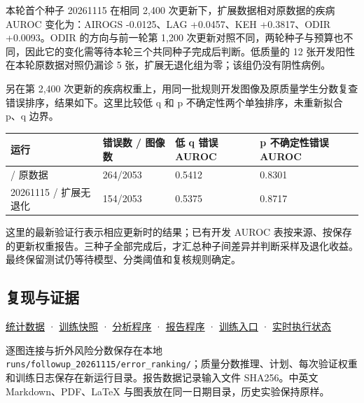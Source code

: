 \documentclass[
  10pt,
]{article}
\begin{document}
本轮首个种子 20261115 在相同 2,400 次更新下，扩展数据相对原数据的疾病
AUROC 变化为：AIROGS -0.0125、LAG +0.0457、KEH +0.3817、ODIR
+0.0093。ODIR 的方向与前一轮第 1,200
次更新对照不同，两轮种子与预算也不同，因此它的变化需等待本轮三个共同种子完成后判断。低质量的
12 张开发阳性在本轮原数据对照仍漏诊 5
张，扩展无退化组为零；该组仍没有阴性病例。

另在第 2,400
次更新的疾病权重上，用同一批规则开发图像及原质量学生分数复查错误排序，结果如下。这里比较低
q 和 p 不确定性两个单独排序，未重新拟合 p、q 边界。

\begin{longtable}[]{@{}llll@{}}
\toprule\noalign{}
运行 & 错误数 / 图像数 & 低 q 错误 AUROC & p 不确定性错误 AUROC \\
\midrule\noalign{}
\endhead
\bottomrule\noalign{}
\endlastfoot
20261115 / 原数据 & 264/2053 & 0.5412 & 0.8301 \\
20261115 / 扩展无退化 & 154/2053 & 0.5375 & 0.8717 \\
\end{longtable}

这里的最新验证行表示相应更新时的结果；已有开发 AUROC
表按来源、按保存的更新权重报告。三种子全部完成后，才汇总种子间差异并判断采样及退化收益。最终保留测试仍等待模型、分类阈值和复核规则确定。

\subsection{复现与证据}\label{ux590dux73b0ux4e0eux8bc1ux636e}

\href{quality-error-analysis.json}{统计数据} ·
\href{training-snapshot.json}{训练快照} ·
\href{../../../tools/analyze_quality_errors_20261115.py}{分析程序} ·
\href{../../../tools/report_quality_training_20261115.py}{报告程序} ·
\href{../../../tools/start_followup_experiments_20261115.ps1}{训练入口}
·
\href{../../../runs/followup_20261115/pipeline/status.json}{实时执行状态}

逐图连接与折外风险分数保存在本地
\texttt{runs/followup\_20261115/error\_ranking/}；质量分数推理、计划、每次验证权重和训练日志保存在新运行目录。报告数据记录输入文件
SHA256。中英文 Markdown、PDF、LaTeX
与图表放在同一日期目录，历史实验保持原样。
\end{document}
